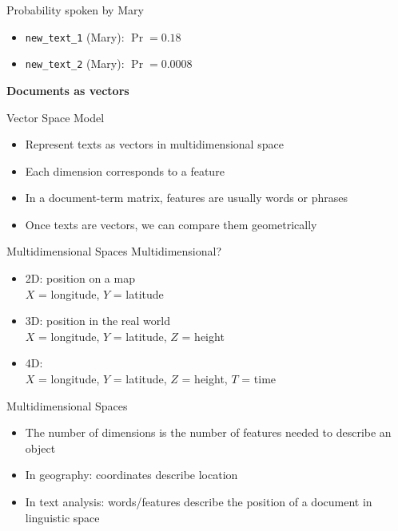\documentclass[11pt,aspectratio=43]{beamer}
\newcommand{\term}[1]{\texttt{#1}}
\begin{document}
\begin{frame}{Probability spoken by Mary}
\begin{itemize}
\item \term{new\_text\_1} (Mary): $\Pr=0.18$
\item \term{new\_text\_2} (Mary): $\Pr=0.0008$
\end{itemize}
\end{frame}

\begin{frame}[plain]
  \centering
  \vfill
  {\LARGE\bfseries
   Documents as vectors\par}
  \vfill
\end{frame}

\begin{frame}{Vector Space Model}
\begin{itemize}
\item Represent texts as vectors in multidimensional space
\item Each dimension corresponds to a feature
\item In a document-term matrix, features are usually words or phrases
\item Once texts are vectors, we can compare them geometrically
\end{itemize}
\end{frame}

\begin{frame}{Multidimensional Spaces}
Multidimensional?
\begin{itemize}
\item 2D: position on a map\\
$X$ = longitude, $Y$ = latitude
\item 3D: position in the real world\\
$X$ = longitude, $Y$ = latitude, $Z$ = height
\item 4D:\\
$X$ = longitude, $Y$ = latitude, $Z$ = height, $T$ = time
\end{itemize}
\end{frame}

\begin{frame}{Multidimensional Spaces}
\begin{itemize}
\item The number of dimensions is the number of features needed to describe an object
\item In geography: coordinates describe location
\item In text analysis: words/features describe the position of a document in linguistic space
\end{itemize}
\end{frame}
\end{document}
